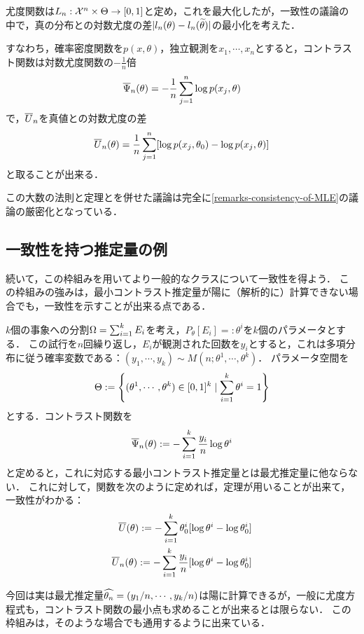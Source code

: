 \documentclass[uplatex,dvipdfmx]{jsreport}
\begin{document}
\begin{example}[最尤推定]
    尤度関数は$L_n:\mathcal{X}^n\times\Theta\to[0,1]$と定め，これを最大化したが，一致性の議論の中で，真の分布との対数尤度の差$\lvert l_n(\theta)-l_n(\widetilde{\theta})\rvert$の最小化を考えた．

    すなわち，確率密度関数を$p(x,\theta)$，独立観測を$x_1,\cdots,x_n$とすると，コントラスト関数は対数尤度関数の$-\frac{1}{n}$倍
    \[\overline{\Psi}_n(\theta)=-\frac{1}{n}\sum^n_{j=1}\log p(x_j,\theta)\]
    で，$\overline{U}_n$を真値との対数尤度の差
    \[\overline{U}_n(\theta)=\frac{1}{n}\sum^n_{j=1}[\log p(x_j,\theta_0)-\log p(x_j,\theta)]\]
    と取ることが出来る．

    この大数の法則と定理とを併せた議論は完全に\ref{remarks-consistency-of-MLE}の議論の厳密化となっている．
\end{example}

\subsection{一致性を持つ推定量の例}

\begin{tcolorbox}[colframe=ForestGreen, colback=ForestGreen!10!white,breakable,colbacktitle=ForestGreen!40!white,coltitle=black,fonttitle=\bfseries\sffamily,
title=]
続いて，この枠組みを用いてより一般的なクラスについて一致性を得よう．
この枠組みの強みは，最小コントラスト推定量が陽に（解析的に）計算できない場合でも，一致性を示すことが出来る点である．
\end{tcolorbox}

\begin{example}[多項分布]\label{exp-multinomial-model}
    $k$個の事象への分割$\Omega=\sum^k_{i=1}E_i$を考え，$P_\theta[E_i]=:\theta^i$を$k$個のパラメータとする．
    この試行を$n$回繰り返し，$E_i$が観測された回数を$y_i$とすると，これは多項分布に従う確率変数である：$(y_1,\cdots,y_k)\sim M(n;\theta^1,\cdots,\theta^k)$．
    パラメータ空間を
    \[\Theta:=\left\{(\theta^1,\cdots,\theta^k)\in[0,1]^k\mid\sum^k_{i=1}\theta^i=1\right\}\]
    とする．コントラスト関数を
    \[\overline{\Psi}_n(\theta):=-\sum^k_{i=1}\frac{y_i}{n}\log\theta^i\]
    と定めると，これに対応する最小コントラスト推定量とは最尤推定量に他ならない．
    これに対して，関数を次のように定めれば，定理が用いることが出来て，一致性がわかる：
    \begin{align*}
        \overline{U}(\theta):=-\sum^k_{i=1}\theta^i_0[\log\theta^i-\log\theta^i_0]\\
        \overline{U}_n(\theta):=-\sum^k_{i=1}\frac{y_i}{n}[\log\theta^i-\log\theta^i_0]
    \end{align*}

    今回は実は最尤推定量$\widehat{\theta_n}=(y_1/n,\cdots,y_k/n)$は陽に計算できるが，一般に尤度方程式も，コントラスト関数の最小点も求めることが出来るとは限らない．
    この枠組みは，そのような場合でも通用するように出来ている．
\end{example}
\end{document}
